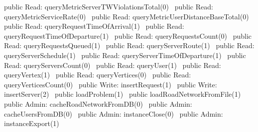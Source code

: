 public \LA{}Read: queryMetricServerTWViolationsTotal(0)~{\nwtagstyle{}}\RA{}
public \LA{}Read: queryMetricServiceRate(0)~{\nwtagstyle{}}\RA{}
public \LA{}Read: queryMetricUserDistanceBaseTotal(0)~{\nwtagstyle{}}\RA{}
public \LA{}Read: queryRequestTimeOfArrival(1)~{\nwtagstyle{}}\RA{}
public \LA{}Read: queryRequestTimeOfDeparture(1)~{\nwtagstyle{}}\RA{}
public \LA{}Read: queryRequestsCount(0)~{\nwtagstyle{}}\RA{}
public \LA{}Read: queryRequestsQueued(1)~{\nwtagstyle{}}\RA{}
public \LA{}Read: queryServerRoute(1)~{\nwtagstyle{}}\RA{}
public \LA{}Read: queryServerSchedule(1)~{\nwtagstyle{}}\RA{}
public \LA{}Read: queryServerTimeOfDeparture(1)~{\nwtagstyle{}}\RA{}
public \LA{}Read: queryServersCount(0)~{\nwtagstyle{}}\RA{}
public \LA{}Read: queryUser(1)~{\nwtagstyle{}}\RA{}
public \LA{}Read: queryVertex(1)~{\nwtagstyle{}}\RA{}
public \LA{}Read: queryVertices(0)~{\nwtagstyle{}}\RA{}
public \LA{}Read: queryVerticesCount(0)~{\nwtagstyle{}}\RA{}
\nwendcode{}\nwdocspar
{}
\nwenddocs{}\plusendmoddef
public \LA{}Write: insertRequest(1)~{\nwtagstyle{}}\RA{}
public \LA{}Write: insertServer(2)~{\nwtagstyle{}}\RA{}
public \LA{}loadProblem(1)~{\nwtagstyle{}}\RA{}
public \LA{}loadRoadNetworkFromFile(1)~{\nwtagstyle{}}\RA{}
\nwendcode{}\nwdocspar
{}
\nwenddocs{}\plusendmoddef
public \LA{}Admin: cacheRoadNetworkFromDB(0)~{\nwtagstyle{}}\RA{}
public \LA{}Admin: cacheUsersFromDB(0)~{\nwtagstyle{}}\RA{}
public \LA{}Admin: instanceClose(0)~{\nwtagstyle{}}\RA{}
public \LA{}Admin: instanceExport(1)~{\nwtagstyle{}}\RA{}
